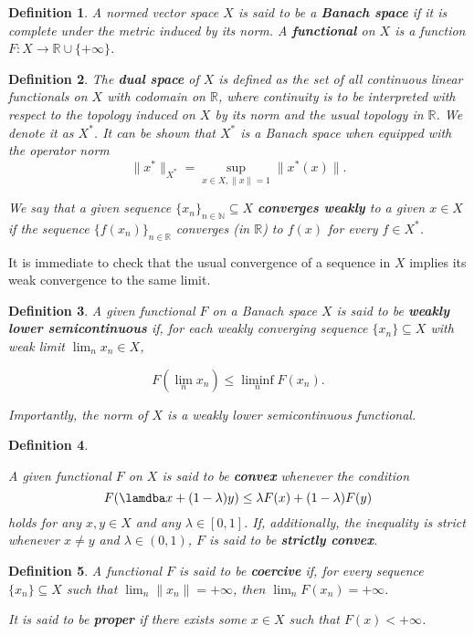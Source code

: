 \documentclass[twocolumn,twoside,a4paper,10pt]{IEEEtran}
\newtheorem{definition}{Definition}
\begin{document}
\begin{definition}
  A normed vector space \(X\) is said to be a \textbf{Banach space} if it is complete under the metric induced by its norm. A \textbf{functional} on \(X\) is a function \(F\colon X\to\mathbb{R}\cup\{+\infty\}\).
\end{definition}

\begin{definition}
  The \textbf{dual space} of \(X\) is defined as the set of all continuous linear functionals on \(X\) with codomain on \(\mathbb{R}\), where continuity is to be interpreted with respect to the topology induced on \(X\) by its norm and the usual topology in \(\mathbb{R}\). We denote it as \(X^*\). It can be shown that \(X^*\) is a Banach space when equipped with the operator norm
  \[
    \|x^*\|_{X^*} = \sup_{x\in X, \|x\|=1}\|x^*(x)\|
  .\]

  We say that a given sequence \(\{x_n\}_{n\in\mathbb{N}}\subseteq X\) \textbf{converges weakly} to a given \(x\in X\) if the sequence \(\{f(x_n)\}_{n\in\mathbb{R}}\) converges (in \(\mathbb{R}\)) to \(f(x)\) for every \(f\in X^*\).
\end{definition}

It is immediate to check that the usual convergence of a sequence in \(X\) implies its weak convergence to the same limit.

\begin{definition}
  A given functional \(F\) on a Banach space \(X\) is said to be \textbf{weakly lower semicontinuous} if, for each weakly converging sequence \(\{x_n\}\subseteq X\) with weak limit \(\lim_nx_n\in X\),

  \[
    F(\lim_nx_n)\leq \liminf_n F(x_n)
  .\]

  Importantly, the norm of \(X\) is a weakly lower semicontinuous functional.
\end{definition}

\begin{definition}\label{def:convexity}

  A given functional \(F\) on \(X\) is said to be \textbf{convex} whenever the condition
  \[
    F(\lamdba x + (1-\lambda)y) \leq \lambda F(x) + (1-\lambda) F(y)
  \]
  holds for any \(x, y\in X\) and any \(\lambda\in[0, 1]\). If, additionally, the inequality is strict whenever \(x\neq y\) and \(\lambda\in (0, 1)\), \(F\) is said to be \textbf{strictly convex}.
\end{definition}

\begin{definition}
  A functional \(F\) is said to be \textbf{coercive} if, for every sequence \(\{x_n\}\subseteq X\) such that \(\lim_n \|x_n\|=+\infty\), then \(\lim_nF(x_n)=+\infty\).

  It is said to be \textbf{proper} if there exists some \(x\in X\) such that \(F(x) < +\infty\).
\end{definition}
\end{document}
